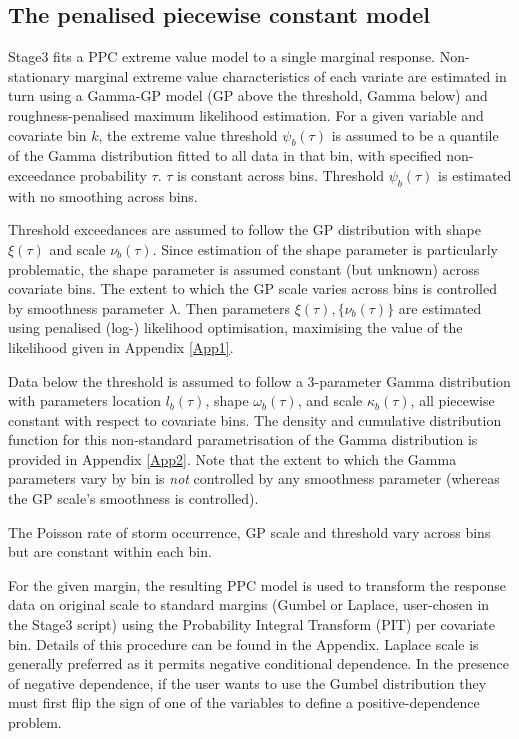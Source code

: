 \subsection{The penalised piecewise constant model}

%
Stage3 fits a PPC extreme value model to a single marginal response. Non-stationary marginal extreme value characteristics of each variate are estimated in turn using a Gamma-GP model (GP above the threshold, Gamma below) and roughness-penalised maximum likelihood estimation. For a given variable and covariate bin $k$, the extreme value threshold $\psi_{b}(\tau)$ is assumed to be a quantile of the Gamma distribution fitted to all data in that bin, with specified non-exceedance probability $\tau$. $\tau$ is constant across bins. Threshold $\psi_{b}(\tau)$ is estimated with no smoothing across bins. 

Threshold exceedances are assumed to follow the GP distribution with shape $\xi(\tau)$ and scale $\nu_{b}(\tau)$. Since estimation of the shape parameter is particularly problematic, the shape parameter is assumed constant (but unknown) across covariate bins. The extent to which the GP scale varies across bins is controlled by smoothness parameter $\lambda$.  Then parameters $\xi(\tau),\{\nu_{b}(\tau)\}$ are estimated using penalised (log-) likelihood optimisation, maximising the value of the likelihood given in Appendix \ref{App1}.

Data below the threshold is assumed to follow a 3-parameter Gamma distribution with parameters location $l_{b}(\tau)$, shape $\omega_{b}(\tau)$, and scale $\kappa_{b}(\tau)$, all piecewise constant with respect to covariate bins. The density and cumulative distribution function for this non-standard parametrisation of the Gamma distribution is provided in Appendix \ref{App2}. Note that the extent to which the Gamma parameters vary by bin is \emph{not} controlled by any smoothness parameter (whereas the GP scale's smoothness is controlled).

The Poisson rate of storm occurrence, GP scale and threshold vary across bins but are constant within each bin. 

For the given margin, the resulting PPC model is used to transform the response data on original scale to standard margins (Gumbel or Laplace, user-chosen in the Stage3 script) using the Probability Integral Transform (PIT) per covariate bin. Details of this procedure can be found in the Appendix. Laplace scale is generally preferred as it permits negative conditional dependence. In the presence of negative dependence, if the user wants to use the Gumbel distribution they must first flip the sign of one of the variables to define a positive-dependence problem.  

